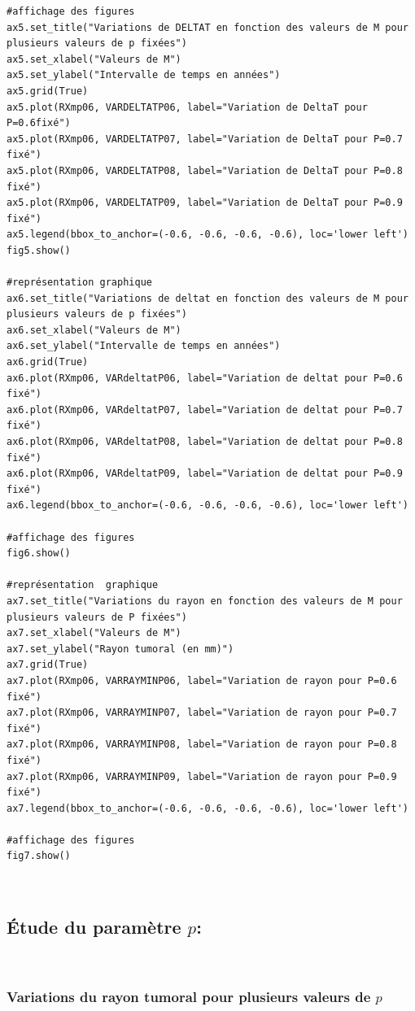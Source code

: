\documentclass[12pt,a4paper]{article}
\begin{document}
\begin{lstlisting}[style=stylepython]
#affichage des figures 
ax5.set_title("Variations de DELTAT en fonction des valeurs de M pour plusieurs valeurs de p fixées")
ax5.set_xlabel("Valeurs de M")
ax5.set_ylabel("Intervalle de temps en années")
ax5.grid(True)
ax5.plot(RXmp06, VARDELTATP06, label="Variation de DeltaT pour P=0.6fixé")
ax5.plot(RXmp06, VARDELTATP07, label="Variation de DeltaT pour P=0.7 fixé")
ax5.plot(RXmp06, VARDELTATP08, label="Variation de DeltaT pour P=0.8 fixé")
ax5.plot(RXmp06, VARDELTATP09, label="Variation de DeltaT pour P=0.9 fixé")
ax5.legend(bbox_to_anchor=(-0.6, -0.6, -0.6, -0.6), loc='lower left')
fig5.show()

#représentation graphique 
ax6.set_title("Variations de deltat en fonction des valeurs de M pour plusieurs valeurs de p fixées")
ax6.set_xlabel("Valeurs de M")
ax6.set_ylabel("Intervalle de temps en années")
ax6.grid(True)
ax6.plot(RXmp06, VARdeltatP06, label="Variation de deltat pour P=0.6 fixé")
ax6.plot(RXmp06, VARdeltatP07, label="Variation de deltat pour P=0.7 fixé")
ax6.plot(RXmp06, VARdeltatP08, label="Variation de deltat pour P=0.8 fixé")
ax6.plot(RXmp06, VARdeltatP09, label="Variation de deltat pour P=0.9 fixé")
ax6.legend(bbox_to_anchor=(-0.6, -0.6, -0.6, -0.6), loc='lower left')

#affichage des figures 
fig6.show()

#représentation  graphique 
ax7.set_title("Variations du rayon en fonction des valeurs de M pour plusieurs valeurs de P fixées")
ax7.set_xlabel("Valeurs de M")
ax7.set_ylabel("Rayon tumoral (en mm)")
ax7.grid(True)
ax7.plot(RXmp06, VARRAYMINP06, label="Variation de rayon pour P=0.6 fixé")
ax7.plot(RXmp06, VARRAYMINP07, label="Variation de rayon pour P=0.7 fixé")
ax7.plot(RXmp06, VARRAYMINP08, label="Variation de rayon pour P=0.8 fixé")
ax7.plot(RXmp06, VARRAYMINP09, label="Variation de rayon pour P=0.9 fixé")
ax7.legend(bbox_to_anchor=(-0.6, -0.6, -0.6, -0.6), loc='lower left')

#affichage des figures 
fig7.show()
\end{lstlisting}
\\
\newpage
\subsection{Étude du paramètre $p$:}
\\
\subsubsection{Variations du rayon tumoral pour plusieurs valeurs de $p$}
\\
\end{document}
